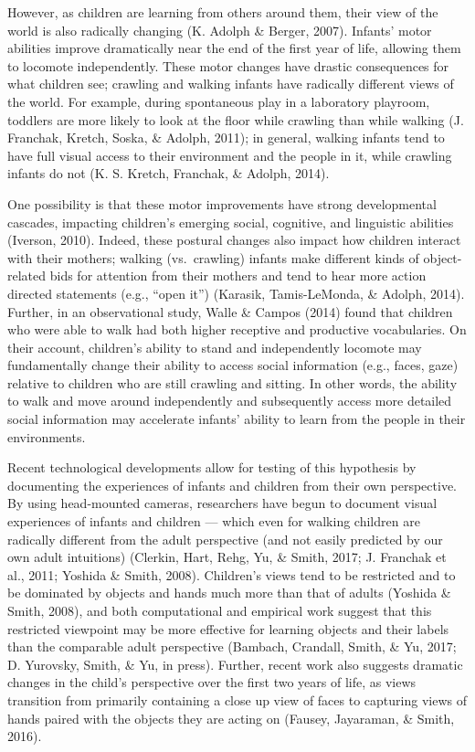 \documentclass[10pt, letterpaper]{article}
\begin{document}
However, as children are learning from others around them, their view of
the world is also radically changing (K. Adolph \& Berger, 2007).
Infants' motor abilities improve dramatically near the end of the first
year of life, allowing them to locomote independently. These motor
changes have drastic consequences for what children see; crawling and
walking infants have radically different views of the world. For
example, during spontaneous play in a laboratory playroom, toddlers are
more likely to look at the floor while crawling than while walking (J.
Franchak, Kretch, Soska, \& Adolph, 2011); in general, walking infants
tend to have full visual access to their environment and the people in
it, while crawling infants do not (K. S. Kretch, Franchak, \& Adolph,
2014).

One possibility is that these motor improvements have strong
developmental cascades, impacting children's emerging social, cognitive,
and linguistic abilities (Iverson, 2010). Indeed, these postural changes
also impact how children interact with their mothers; walking
(vs.~crawling) infants make different kinds of object-related bids for
attention from their mothers and tend to hear more action directed
statements (e.g., ``open it'') (Karasik, Tamis-LeMonda, \& Adolph,
2014). Further, in an observational study, Walle \& Campos (2014) found
that children who were able to walk had both higher receptive and
productive vocabularies. On their account, children's ability to stand
and independently locomote may fundamentally change their ability to
access social information (e.g., faces, gaze) relative to children who
are still crawling and sitting. In other words, the ability to walk and
move around independently and subsequently access more detailed social
information may accelerate infants' ability to learn from the people in
their environments.

Recent technological developments allow for testing of this hypothesis
by documenting the experiences of infants and children from their own
perspective. By using head-mounted cameras, researchers have begun to
document visual experiences of infants and children --- which even for
walking children are radically different from the adult perspective (and
not easily predicted by our own adult intuitions) (Clerkin, Hart, Rehg,
Yu, \& Smith, 2017; J. Franchak et al., 2011; Yoshida \& Smith, 2008).
Children's views tend to be restricted and to be dominated by objects
and hands much more than that of adults (Yoshida \& Smith, 2008), and
both computational and empirical work suggest that this restricted
viewpoint may be more effective for learning objects and their labels
than the comparable adult perspective (Bambach, Crandall, Smith, \& Yu,
2017; D. Yurovsky, Smith, \& Yu, in press). Further, recent work also
suggests dramatic changes in the child's perspective over the first two
years of life, as views transition from primarily containing a close up
view of faces to capturing views of hands paired with the objects they
are acting on (Fausey, Jayaraman, \& Smith, 2016).
\end{document}

